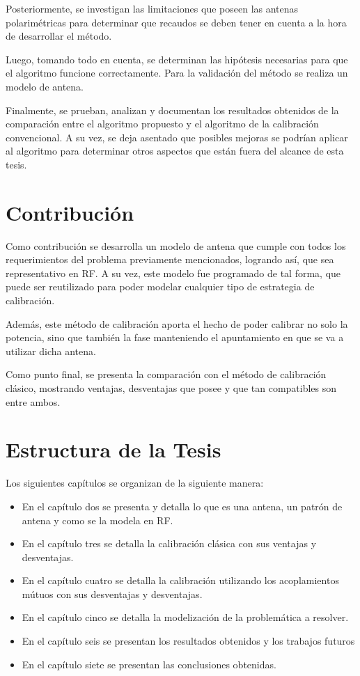 Posteriormente, se investigan las limitaciones que poseen las antenas polarimétricas para determinar que recaudos 
se deben tener en cuenta a la hora de desarrollar el método.

Luego, tomando todo en cuenta, se determinan las hipótesis necesarias para que el algoritmo funcione correctamente. Para 
la validación del método se realiza un modelo de antena.

Finalmente, se prueban, analizan y documentan los resultados obtenidos de la comparación entre el algoritmo propuesto 
y el algoritmo de la calibración convencional. A su vez, se deja asentado que posibles mejoras se podrían aplicar al 
algoritmo para determinar otros aspectos que están fuera del alcance de esta tesis.

\section{Contribución}

Como contribución se desarrolla un modelo de antena que cumple con todos los requerimientos del problema previamente 
mencionados, logrando así, que sea representativo en RF. A su vez, este modelo fue programado de tal forma, que puede
ser reutilizado para poder modelar cualquier tipo de estrategia de calibración.

Además, este método de calibración aporta el hecho de poder calibrar no solo la potencia, sino que también la fase 
manteniendo el apuntamiento en que se va a utilizar dicha antena.

Como punto final, se presenta la comparación con el método de calibración clásico, mostrando ventajas, desventajas 
que posee y que tan compatibles son entre ambos.


\section{Estructura de la Tesis}

Los siguientes capítulos se organizan de la siguiente manera: 
\begin{itemize}
	\item En el capítulo dos se presenta y detalla lo que es una antena, un patrón de antena y como se la modela en RF.
	\item En el capítulo tres se detalla la calibración clásica con sus ventajas y desventajas.
	\item En el capítulo cuatro se detalla la calibración utilizando los acoplamientos mútuos con sus desventajas y desventajas.
	\item En el capítulo cinco se detalla la modelización de la problemática a resolver. 
	\item En el capítulo seis se presentan los resultados obtenidos y los trabajos futuros 
	\item En el capítulo siete se presentan las conclusiones obtenidas.
\end{itemize}

